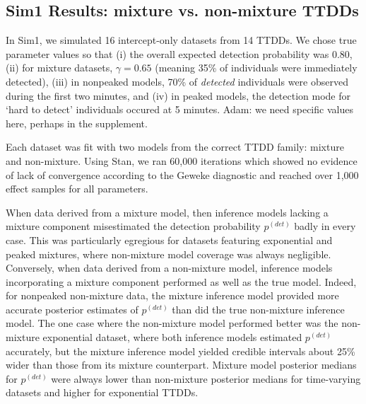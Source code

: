 \documentclass[useAMS,usenatbib,referee,12pt]{article}
\newcommand{\jarad}[1]{{\color{Orange} #1}}
\begin{document}
\subsection{Sim1 Results: mixture vs. non-mixture TTDDs}\label{sec:mixture}

In Sim1, we simulated 16 intercept-only datasets from 14 TTDDs. 
We chose true parameter values so that (i) the overall expected detection probability was 0.80, (ii) for mixture datasets, $\gamma = 0.65$ (meaning 35\% of individuals were immediately detected), (iii) in nonpeaked models, 70\% of \textit{detected} individuals were observed during the first two minutes, and (iv) in peaked models, the detection mode for `hard to detect' individuals occured at 5 minutes.
\jarad{Adam: we need specific values here, perhaps in the supplement.}

Each dataset was fit with two models from the correct TTDD family: mixture and non-mixture. 
Using Stan, we ran 60,000 iterations which showed no evidence of lack of convergence according to the Geweke diagnostic and reached over 1,000 effect samples for all parameters.



When data derived from a mixture model, then inference models lacking a mixture component misestimated the detection probability $p^{(det)}$ badly in every case.  
This was particularly egregious for datasets featuring exponential and peaked mixtures, where non-mixture model coverage was always negligible.  
Conversely, when data derived from a non-mixture model, inference models incorporating a mixture component performed as well as the true model.  
Indeed, for nonpeaked non-mixture data, the mixture inference model provided more accurate posterior estimates of $p^{(det)}$ than did the true non-mixture inference model.  
The one case where the non-mixture model performed better was the non-mixture exponential dataset, where both inference models estimated $p^{(det)}$ accurately, but the mixture inference model yielded credible intervals about 25\% wider than those from its mixture counterpart.
Mixture model posterior medians for $p^{(det)}$ were always lower than non-mixture posterior medians for time-varying datasets and higher for exponential TTDDs.
\end{document}
